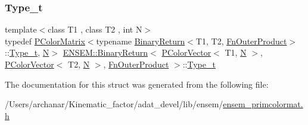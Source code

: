 \subsubsection{\texorpdfstring{Type\_t}{Type\_t}\hspace{0.1cm}{\footnotesize\ttfamily [2/2]}}
{\footnotesize\ttfamily template$<$class T1 , class T2 , int N$>$ \\
typedef \mbox{\hyperlink{classENSEM_1_1PColorMatrix}{P\+Color\+Matrix}}$<$typename \mbox{\hyperlink{structENSEM_1_1BinaryReturn}{Binary\+Return}}$<$T1, T2, \mbox{\hyperlink{structENSEM_1_1FnOuterProduct}{Fn\+Outer\+Product}}$>$\+::\mbox{\hyperlink{structENSEM_1_1BinaryReturn_3_01PColorVector_3_01T1_00_01N_01_4_00_01PColorVector_3_01T2_00_01N_01_4_00_01FnOuterProduct_01_4_a7650dfea24e42c0184a3b25c77d5da81}{Type\+\_\+t}}, \mbox{\hyperlink{operator__name__util_8cc_a7722c8ecbb62d99aee7ce68b1752f337}{N}}$>$ \mbox{\hyperlink{structENSEM_1_1BinaryReturn}{E\+N\+S\+E\+M\+::\+Binary\+Return}}$<$ \mbox{\hyperlink{classENSEM_1_1PColorVector}{P\+Color\+Vector}}$<$ T1, \mbox{\hyperlink{operator__name__util_8cc_a7722c8ecbb62d99aee7ce68b1752f337}{N}} $>$, \mbox{\hyperlink{classENSEM_1_1PColorVector}{P\+Color\+Vector}}$<$ T2, \mbox{\hyperlink{operator__name__util_8cc_a7722c8ecbb62d99aee7ce68b1752f337}{N}} $>$, \mbox{\hyperlink{structENSEM_1_1FnOuterProduct}{Fn\+Outer\+Product}} $>$\+::\mbox{\hyperlink{structENSEM_1_1BinaryReturn_3_01PColorVector_3_01T1_00_01N_01_4_00_01PColorVector_3_01T2_00_01N_01_4_00_01FnOuterProduct_01_4_a7650dfea24e42c0184a3b25c77d5da81}{Type\+\_\+t}}}



The documentation for this struct was generated from the following file\+:\begin{DoxyCompactItemize}
\item 
/\+Users/archanar/\+Kinematic\+\_\+factor/adat\+\_\+devel/lib/ensem/\mbox{\hyperlink{lib_2ensem_2ensem__primcolormat_8h}{ensem\+\_\+primcolormat.\+h}}\end{DoxyCompactItemize}
